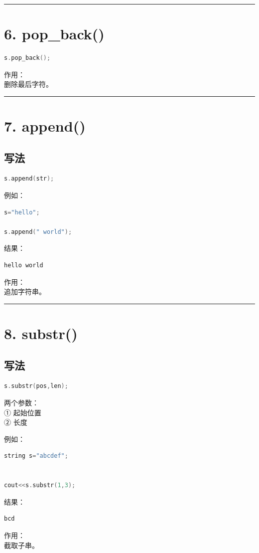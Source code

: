 \documentclass[10pt,twocolumn]{extarticle}
\begin{document}
\noindent\rule{\linewidth}{0.4pt}

\section{6. pop\_back()}
\begin{lstlisting}[language=C++]
s.pop_back();
\end{lstlisting}
作用：\\
删除最后字符。

\noindent\rule{\linewidth}{0.4pt}

\section{7. append()}

\subsection{写法}
\begin{lstlisting}[language=C++]
s.append(str);
\end{lstlisting}
例如：
\begin{lstlisting}[language=C++]
s="hello";

s.append(" world");
\end{lstlisting}
结果：
\begin{lstlisting}
hello world
\end{lstlisting}
作用：\\
追加字符串。

\noindent\rule{\linewidth}{0.4pt}

\section{8. substr()}

\subsection{写法}
\begin{lstlisting}[language=C++]
s.substr(pos,len);
\end{lstlisting}
两个参数：\\
① 起始位置\\
② 长度

例如：
\begin{lstlisting}[language=C++]
string s="abcdef";


cout<<s.substr(1,3);
\end{lstlisting}
结果：
\begin{lstlisting}
bcd
\end{lstlisting}
作用：\\
截取子串。
\end{document}
